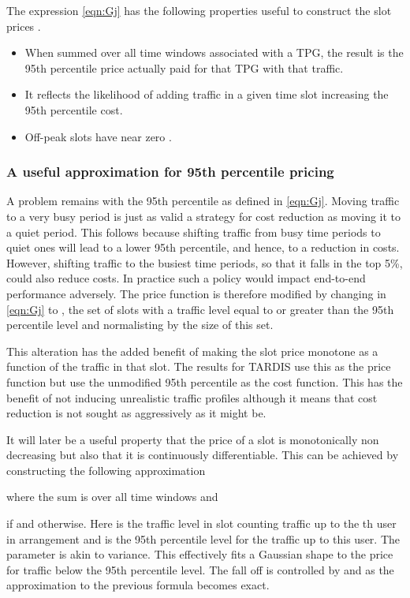 The expression \eqref{eqn:Gj} has the following properties useful to construct the 
slot prices .
\begin{itemize}
\item When summed over all time windows associated with a TPG, 
the result is the 95th percentile price actually paid for that TPG
with that traffic.
\item It reflects the likelihood of adding traffic in a given time
slot increasing the 95th percentile cost.
\item Off-peak slots have near zero .
\end{itemize}

\subsubsection{A useful approximation for 95th percentile pricing}

A problem remains with the 95th percentile  as defined in \eqref{eqn:Gj}.  
Moving traffic to a very busy period is just as valid a strategy for 
cost reduction as moving it to a quiet period.  
This follows because shifting traffic from busy time periods to quiet
ones will lead to a lower 95th percentile, and hence, to a reduction in costs.  
However, shifting traffic to the busiest time periods, so that it 
falls in the top 5\%, could also reduce costs.
In practice such a policy would impact end-to-end performance adversely.
The price function is therefore modified by changing  
in \eqref{eqn:Gj} to , the set of slots with a traffic 
level equal to or greater than the 95th percentile level and 
normalisting by the size of this set.


  
This alteration has the added benefit of making the slot price  
monotone as a function of the traffic in that slot.  The results
for TARDIS use this as the price function but use the unmodified 
95th percentile as the cost function.  This has the benefit of not
inducing unrealistic traffic profiles although it means that cost
reduction is not sought as aggressively as it might be.

It will later be a useful property that the price
of a slot is monotonically non decreasing but also that it is continuously 
differentiable.  This can be achieved by constructing the following
approximation 

where the  sum is over all time windows and

if  and
 otherwise.
Here  is the traffic level in slot  counting traffic up to the th user in arrangement  and  is the 95th percentile level for the traffic up to this user.
The parameter  is akin to variance.  This effectively fits a Gaussian shape to the price for traffic below the 95th percentile level.  The fall off is controlled by  and as  the approximation 
to the previous formula becomes exact. 


